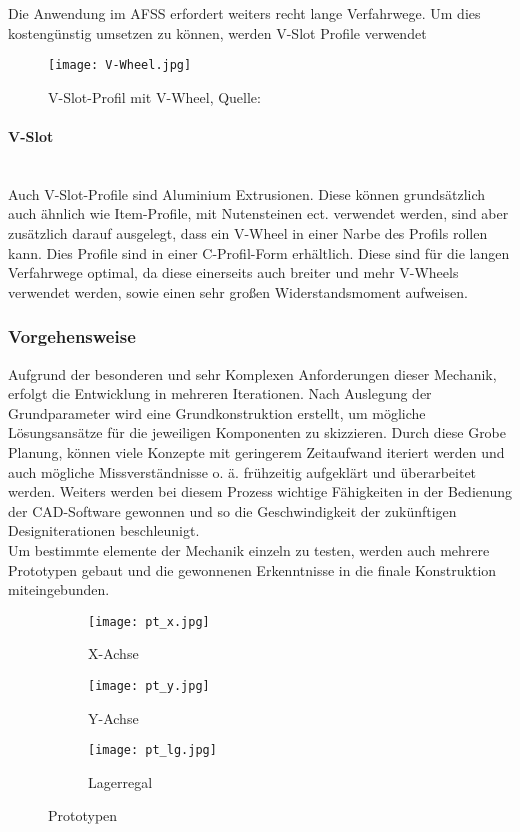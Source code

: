 Die Anwendung im AFSS erfordert weiters recht lange Verfahrwege. Um dies kostengünstig umsetzen zu können, werden V-Slot Profile verwendet


\begin{wrapfigure}{R}{0.3\textwidth}
    \texttt{[image: V-Wheel.jpg]}
    \centering
    \caption{V-Slot-Profil mit V-Wheel, Quelle: \cite{v_slot_wheel}}
\end{wrapfigure}
\paragraph{V-Slot}\mbox{}\\
Auch V-Slot-Profile sind Aluminium Extrusionen. Diese können grundsätzlich auch ähnlich wie Item-Profile, mit Nutensteinen ect. verwendet werden, sind aber zusätzlich darauf ausgelegt, dass ein V-Wheel in einer Narbe des Profils rollen kann. Dies Profile sind in einer C-Profil-Form erhältlich. Diese sind für die langen Verfahrwege optimal, da diese einerseits auch breiter und mehr V-Wheels verwendet werden, sowie einen sehr großen Widerstandsmoment aufweisen. 


\subsubsection{Vorgehensweise}
Aufgrund der besonderen und sehr Komplexen Anforderungen dieser Mechanik, erfolgt die Entwicklung in mehreren Iterationen. Nach Auslegung der Grundparameter wird eine Grundkonstruktion erstellt, um mögliche Lösungsansätze für die jeweiligen Komponenten zu skizzieren. Durch diese Grobe Planung, können viele Konzepte mit geringerem Zeitaufwand iteriert werden und auch mögliche Missverständnisse o. ä. frühzeitig aufgeklärt und überarbeitet werden. Weiters werden bei diesem Prozess wichtige Fähigkeiten in der Bedienung der CAD-Software gewonnen und so die Geschwindigkeit der zukünftigen Designiterationen beschleunigt.\\
Um bestimmte elemente der Mechanik einzeln zu testen, werden auch mehrere Prototypen gebaut und die gewonnenen Erkenntnisse in die finale Konstruktion miteingebunden. \\

\begin{figure}[H]
    \centering
    \begin{subfigure}{.3\textwidth}
        \centering
        \texttt{[image: pt\_x.jpg]}
        \caption{X-Achse}
        \label{pts:plt_x}
    \end{subfigure}%
    \begin{subfigure}{.3\textwidth}
        \centering
        \texttt{[image: pt\_y.jpg]}
        \caption{Y-Achse}
        \label{pts:plt_y}
    \end{subfigure}%
    \begin{subfigure}{.3\textwidth}
        \centering
        \texttt{[image: pt\_lg.jpg]}
        \caption{Lagerregal}
        \label{pts:plt_ls}
    \end{subfigure}
    \caption{Prototypen}
    \label{pts}
\end{figure}

